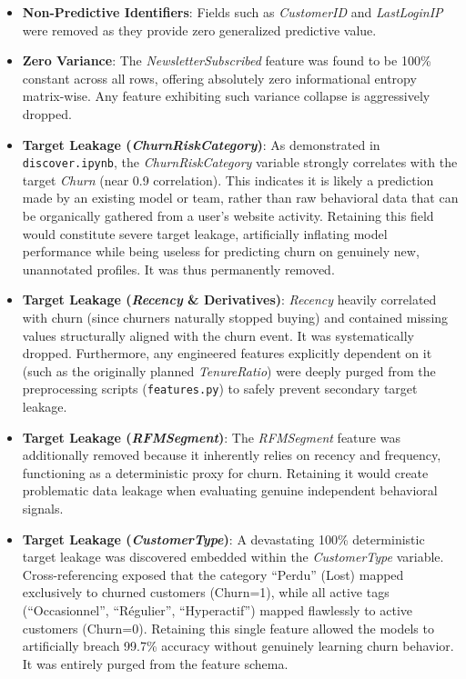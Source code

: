 \documentclass[11pt,a4paper]{article}
\begin{document}
\begin{itemize}
    \item \textbf{Non-Predictive Identifiers}: Fields such as \textit{CustomerID} and \textit{LastLoginIP} were removed as they provide zero generalized predictive value.
    \item \textbf{Zero Variance}: The \textit{NewsletterSubscribed} feature was found to be 100\% constant across all rows, offering absolutely zero informational entropy matrix-wise. Any feature exhibiting such variance collapse is aggressively dropped.
    \item \textbf{Target Leakage (\textit{ChurnRiskCategory})}: As demonstrated in \texttt{discover.ipynb}, the \textit{ChurnRiskCategory} variable strongly correlates with the target \textit{Churn} (near 0.9 correlation). This indicates it is likely a prediction made by an existing model or team, rather than raw behavioral data that can be organically gathered from a user's website activity. Retaining this field would constitute severe target leakage, artificially inflating model performance while being useless for predicting churn on genuinely new, unannotated profiles. It was thus permanently removed.
    \item \textbf{Target Leakage (\textit{Recency} \& Derivatives)}: \textit{Recency} heavily correlated with churn (since churners naturally stopped buying) and contained missing values structurally aligned with the churn event. It was systematically dropped. Furthermore, any engineered features explicitly dependent on it (such as the originally planned \textit{TenureRatio}) were deeply purged from the preprocessing scripts (\texttt{features.py}) to safely prevent secondary target leakage.
    \item \textbf{Target Leakage (\textit{RFMSegment})}: The \textit{RFMSegment} feature was additionally removed because it inherently relies on recency and frequency, functioning as a deterministic proxy for churn. Retaining it would create problematic data leakage when evaluating genuine independent behavioral signals.
    \item \textbf{Target Leakage (\textit{CustomerType})}: A devastating 100\% deterministic target leakage was discovered embedded within the \textit{CustomerType} variable. Cross-referencing exposed that the category ``Perdu'' (Lost) mapped exclusively to churned customers (Churn=1), while all active tags (``Occasionnel'', ``Régulier'', ``Hyperactif'') mapped flawlessly to active customers (Churn=0). Retaining this single feature allowed the models to artificially breach 99.7\% accuracy without genuinely learning churn behavior. It was entirely purged from the feature schema.
\end{itemize}
\end{document}
